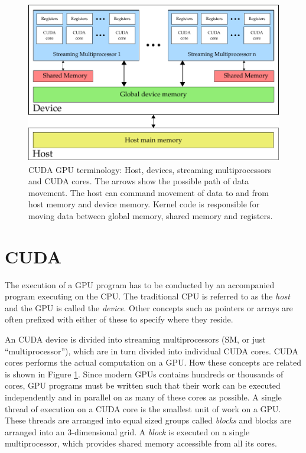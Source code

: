 \begin{figure}
  \centering
  \includegraphics[width=\textwidth]{graphics/cuda-structure}
  \vspace{2mm}
  \caption{CUDA GPU terminology: Host, devices, streaming
    multiprocessors and CUDA cores. The arrows show the possible path
    of data movement. The host can command movement of data to and
    from host memory and device memory. Kernel code is responsible for
    moving data between global memory, shared memory and registers.}
  \label{fig:gpu_terminology}
\end{figure}

\section{CUDA}
The execution of a GPU program has to be conducted by an accompanied
program executing on the CPU. The traditional CPU is referred to as
the \textit{host} and the GPU is called the \textit{device}. Other
concepts such as pointers or arrays are often prefixed with either of
these to specify where they reside.

An CUDA device is divided into streaming multiprocessors (SM, or just
``multiprocessor''), which are in turn divided into individual CUDA
cores. CUDA cores performs the actual computation on a GPU. How these
concepts are related is shown in Figure \ref{fig:gpu_terminology}.
Since modern GPUs contains hundreds or thousands of cores, GPU
programs must be written such that their work can be executed
independently and in parallel on as many of these cores as possible. A
single thread of execution on a CUDA core is the smallest unit of work
on a GPU. These threads are arranged into equal sized groups called
\textit{blocks} and blocks are arranged into an $3$-dimensional
grid. A \textit{block} is executed on a single multiprocessor, which
provides shared memory accessible from all its cores.

